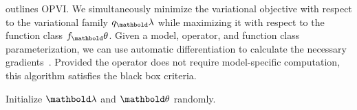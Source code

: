    outlines \gls{OPVI}.  We
simultaneously minimize the variational objective with respect to the
variational family $q_\mblambda$ while maximizing it with respect to the
function class $f_\mbtheta$.  Given a model, operator, and function
class parameterization, we can use automatic differentiation to
calculate the necessary gradients~\citep{carpenter2015stan}.  Provided
the operator does not require model-specific computation, this
algorithm satisfies the black box criteria.

\begin{algorithm}[t]
Initialize $\mblambda$ and $\mbtheta$ randomly. \\
 \caption{}
 \label{alg:operator_vi}
\end{algorithm}
